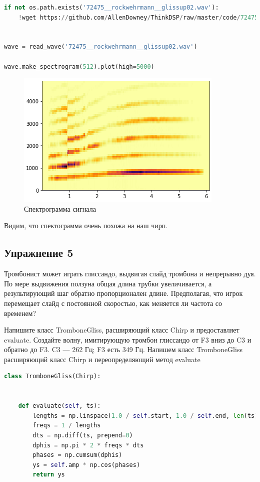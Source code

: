 \begin{lstlisting}[language=Python]
if not os.path.exists('72475__rockwehrmann__glissup02.wav'):
    !wget https://github.com/AllenDowney/ThinkDSP/raw/master/code/72475__rockwehrmann__glissup02.wav
    

wave = read_wave('72475__rockwehrmann__glissup02.wav')

wave.make_spectrogram(512).plot(high=5000)
\end{lstlisting}
\begin{figure}[H]
	\begin{center}
		\includegraphics[scale=1]{fig/lab03/lab3_8.png}
		\caption{Спектрограмма сигнала}
	\end{center}
\end{figure}

Видим, что спектограмма очень похожа на наш чирп.

\subsection{Упражнение 5}

Тромбонист может играть глиссандо, выдвигая слайд тромбона и непрерывно дуя. По мере выдвижения ползуна общая длина трубки увеличивается, а результирующий шаг обратно пропорционален длине.
Предполагая, что игрок перемещает слайд с постоянной скоростью, как меняется ли частота со временем?

\noindent Напишите класс TromboneGliss, расширяющий класс Chirp и предоставляет evaluate. Создайте волну, имитирующую тромбон глиссандо от F3 вниз до C3 и обратно до F3. C3 — 262 Гц; F3 есть 349 Гц.
Напишем класс TromboneGliss расширяющий класс Chirp и переопределяющий метод evaluate

\begin{lstlisting}[language=Python]
class TromboneGliss(Chirp):

    
    def evaluate(self, ts):
        lengths = np.linspace(1.0 / self.start, 1.0 / self.end, len(ts))
        freqs = 1 / lengths
        dts = np.diff(ts, prepend=0)
        dphis = np.pi * 2 * freqs * dts
        phases = np.cumsum(dphis)
        ys = self.amp * np.cos(phases)
        return ys
\end{lstlisting}

